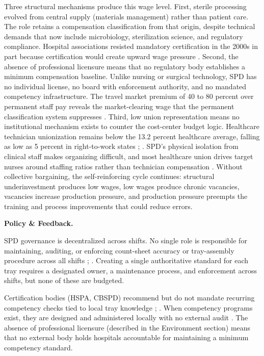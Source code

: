 \documentclass[10pt,a4paper]{article}
\begin{document}
Three structural mechanisms produce this wage level. First, sterile processing
evolved from central supply (materials management) rather than patient care. The
role retains a compensation classification from that origin, despite technical
demands that now include microbiology, sterilization science, and regulatory
compliance. Hospital associations resisted mandatory certification in the 2000s
in part because certification would create upward wage pressure
\cite{evolved-sterile-processing-2025}. Second, the absence of professional
licensure means that no regulatory body establishes a minimum compensation
baseline. Unlike nursing or surgical technology, SPD has no individual license,
no board with enforcement authority, and no mandated competency infrastructure.
The travel market premium of 40 to 80 percent over permanent staff pay reveals
the market-clearing wage that the permanent classification system suppresses
\cite{specialtycare-travel-spd-2026}. Third, low union representation means no
institutional mechanism exists to counter the cost-center budget logic.
Healthcare technician unionization remains below the 13.2 percent healthcare
average, falling as low as 5 percent in right-to-work states
\cite{bls-union-2023};
\cite{trends-in-labor-unionization-2022}. SPD's physical
isolation from clinical staff makes organizing difficult, and most healthcare
union drives target nurses around staffing ratios rather than technician
compensation \cite{ashhra-2024}. Without collective bargaining, the
self-reinforcing cycle continues: structural underinvestment produces low wages,
low wages produce chronic vacancies, vacancies increase production pressure, and
production pressure preempts the training and process improvements that could
reduce errors.

\textbf{Policy \& Feedback.}

SPD governance is decentralized across shifts. No single role is responsible for
maintaining, auditing, or enforcing count-sheet accuracy or tray-assembly
procedure across all shifts
\cite{nadeau-2024};
\cite{loria-2024}. Creating a single
authoritative standard for each tray requires a designated owner, a maintenance
process, and enforcement across shifts, but none of these are budgeted.

Certification bodies (HSPA, CBSPD) recommend but do not mandate recurring
competency checks tied to local tray knowledge
\cite{kovach-2012};
\cite{ofstead-et-al-2023}. When competency programs exist, they are designed and
administered locally with no external audit
\cite{lind-2026b}. The absence of
professional licensure (described in the Environment section) means that no
external body holds hospitals accountable for maintaining a minimum competency
standard.
\end{document}
